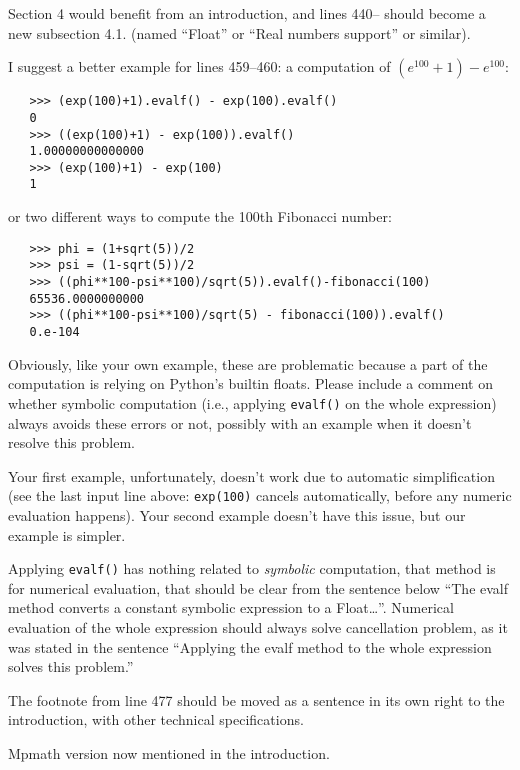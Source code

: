 \documentclass[answers,12pt]{exam}
\begin{document}
\begin{questions}
\question Section 4 would benefit from an introduction, and lines 440-- should become a new subsection 4.1. (named ``Float'' or ``Real numbers support'' or similar).
\begin{solution}

\end{solution}

\question I suggest a better example for lines 459--460: a computation of $(e^{100} +1)− e^{100}$:

\begin{verbatim}
   >>> (exp(100)+1).evalf() - exp(100).evalf()
   0
   >>> ((exp(100)+1) - exp(100)).evalf()
   1.00000000000000
   >>> (exp(100)+1) - exp(100)
   1
\end{verbatim}

or two different ways to compute the 100th Fibonacci number:

\begin{verbatim}
   >>> phi = (1+sqrt(5))/2
   >>> psi = (1-sqrt(5))/2
   >>> ((phi**100-psi**100)/sqrt(5)).evalf()-fibonacci(100)
   65536.0000000000
   >>> ((phi**100-psi**100)/sqrt(5) - fibonacci(100)).evalf()
   0.e-104
\end{verbatim}

Obviously, like your own example, these are problematic because a part of the computation is relying on Python's builtin floats. Please include a comment on whether symbolic computation (i.e., applying \texttt{evalf()} on the whole expression) always avoids these errors or not, possibly with an example when it doesn't resolve this problem.
\begin{solution}
  Your first example, unfortunately, doesn't work due to automatic
  simplification (see the last input line above:  \texttt{exp(100)} cancels
  automatically, before any numeric evaluation happens). Your second example
  doesn't have this issue, but our example is simpler.

Applying \texttt{evalf()} has nothing related to \emph{symbolic} computation,
that method is for numerical evaluation, that should be clear from
the sentence below ``The evalf method converts a constant symbolic expression
to a Float\dots''.  Numerical evaluation of the whole expression should
always solve cancellation problem, as it was stated in the sentence
``Applying the evalf method to the whole expression solves this problem.''
\end{solution}

\question The footnote from line 477 should be moved as a sentence in its own right to the introduction, with other technical specifications.
\begin{solution}
Mpmath version now mentioned in the introduction.
\end{solution}


\end{questions}
\end{document}
